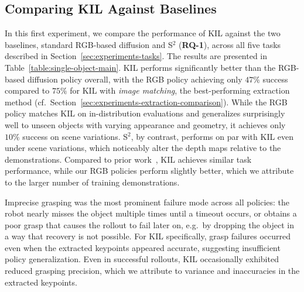 \documentclass[letterpaper, 10 pt, conference]{ieeeconf}  %
\newcommand{\thomas}[1]{{\color{ForestGreen} TL: #1}}
\begin{document}
\subsection{Comparing KIL Against Baselines}
\label{sec:experiments-generalization}
In this first experiment, we compare the performance of KIL against the two baselines, standard RGB-based diffusion and S$^2$ (\textbf{RQ-1}), across all five tasks described in Section~\ref{sec:experiments-tasks}.
The results are presented in Table~\ref{table:single-object-main}. KIL performs significantly better than the RGB-based diffusion policy overall, with the RGB policy achieving only $47\%$ success compared to $75\%$ for KIL with \textit{image matching}, the best-performing extraction method (cf.\ Section~\ref{sec:experiments-extraction-comparison}). While the RGB policy matches KIL on in-distribution evaluations and generalizes surprisingly well to unseen objects with varying appearance and geometry, it achieves only $10\%$ success on scene variations. S$^2$, by contrast, performs on par with KIL even under scene variations, which noticeably alter the depth maps relative to the demonstrations. Compared to prior work~\cite{di2024KAT,Levy2025P3PO,wang2025skil}, KIL achieves similar task performance, while our RGB policies perform slightly better, which we attribute to the larger number of training demonstrations.

Imprecise grasping was the most prominent failure mode across all policies: the robot nearly misses the object multiple times until a timeout occurs, or obtains a poor grasp that causes the rollout to fail later on, e.g.\ by dropping the object in a way that recovery is not possible. For KIL specifically, grasp failures occurred even when the extracted keypoints appeared accurate, suggesting insufficient policy generalization. Even in successful rollouts, KIL occasionally exhibited reduced grasping precision, which we attribute to variance and inaccuracies in the extracted keypoints.

\end{document}

